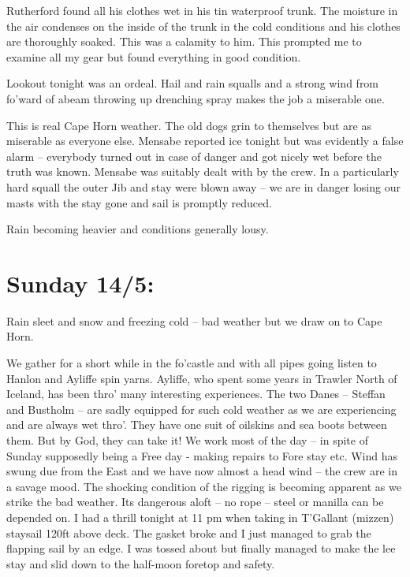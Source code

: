 \documentclass[
  11pt,
  msmallroyalvopaper
]{memoir}
\begin{document}
Rutherford found all his clothes wet in his tin waterproof trunk. The
moisture in the air condenses on the inside of the trunk in the cold
conditions and his clothes are thoroughly soaked. This was a calamity to
him. This prompted me to examine all my gear but found everything in
good condition.

Lookout tonight was an ordeal. Hail and rain squalls and a strong wind
from fo'ward of abeam throwing up drenching spray makes the job a
miserable one.

This is real Cape Horn weather. The old dogs grin to themselves but are
as miserable as everyone else. Mensabe reported ice tonight but was
evidently a false alarm -- everybody turned out in case of danger and
got nicely wet before the truth was known. Mensabe was suitably dealt
with by the crew. In a particularly hard squall the outer Jib and stay
were blown away -- we are in danger losing our masts with the stay gone
and sail is promptly reduced.

Rain becoming heavier and conditions generally lousy.

\hypertarget{sunday-145}{%
\section{Sunday 14/5:}\label{sunday-145}}

Rain sleet and snow and freezing cold -- bad weather but we draw on to
Cape Horn.

We gather for a short while in the fo'castle and with all pipes going
listen to Hanlon and Ayliffe spin yarns. Ayliffe, who spent some years
in Trawler North of Iceland, has been thro' many interesting
experiences. The two Danes -- Steffan and Bustholm -- are sadly equipped
for such cold weather as we are experiencing and are always wet thro'.
They have one suit of oilskins and sea boots between them. But by God,
they can take it! We work most of the day -- in spite of Sunday
supposedly being a Free day - making repairs to Fore stay etc. Wind has
swung due from the East and we have now almost a head wind -- the crew
are in a savage mood. The shocking condition of the rigging is becoming
apparent as we strike the bad weather. Its dangerous aloft -- no rope --
steel or manilla can be depended on. I had a thrill tonight at 11 pm
when taking in T'Gallant (mizzen) staysail 120ft above deck. The gasket
broke and I just managed to grab the flapping sail by an edge. I was
tossed about but finally managed to make the lee stay and slid down to
the half-moon foretop and safety.
\end{document}

